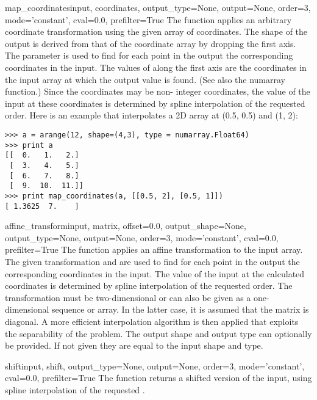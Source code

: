 \begin{funcdesc}{map_coordinates}{input, coordinates, output_type=None, 
    output=None, order=3, mode='constant', cval=0.0, prefilter=True} 
  The function  applies an arbitrary coordinate
  transformation using the given array of coordinates. The shape of the 
  output is derived from that of the coordinate array by dropping the first 
  axis. The parameter  is used to find for each point in 
  the output the corresponding coordinates in the input. The values of 
   along the first axis are the coordinates in the input 
  array at which the output value is found. (See also the numarray 
   function.) Since the coordinates may be non-
  integer coordinates, the value of the input at these coordinates is 
  determined by spline interpolation of the requested order. Here is an 
  example that interpolates a 2D array at (0.5, 0.5) and (1, 2):
\begin{verbatim}
>>> a = arange(12, shape=(4,3), type = numarray.Float64)
>>> print a
[[  0.   1.   2.]
 [  3.   4.   5.]
 [  6.   7.   8.]
 [  9.  10.  11.]]
>>> print map_coordinates(a, [[0.5, 2], [0.5, 1]])
[ 1.3625  7.    ]
\end{verbatim}
\end{funcdesc}

\begin{funcdesc}{affine_transform}{input, matrix, offset=0.0, 
  output_shape=None, output_type=None, output=None, order=3, 
  mode='constant', cval=0.0, prefilter=True} The 
   function applies an affine transformation to 
  the input array. The given transformation  and  
  are used to find for each point in the output the corresponding 
  coordinates in the input.  The value of the input at the
  calculated coordinates is determined by spline interpolation of the 
  requested order. The transformation  must be two-dimensional 
  or can also be given as a one-dimensional sequence or array.  In the 
  latter case, it is assumed that the matrix is diagonal. A more efficient 
  interpolation algorithm is then applied that exploits the separability of 
  the problem.  The output shape and output type can optionally be 
  provided. If not given they are equal to the input shape and type.
\end{funcdesc}

\begin{funcdesc}{shift}{input, shift, output_type=None, output=None, 
  order=3, mode='constant', cval=0.0, prefilter=True} The  
  function returns a shifted version of the input, using spline 
  interpolation of the requested .
\end{funcdesc}

